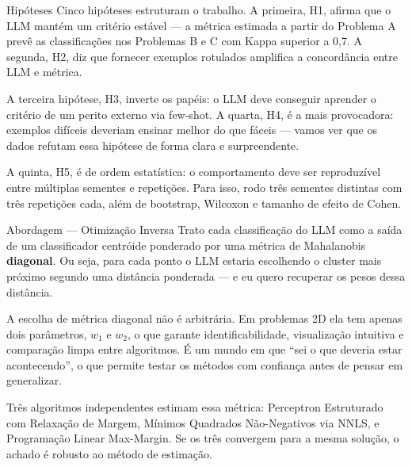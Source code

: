 \documentclass[aspectratio=169,10pt]{beamer}
\begin{document}
\begin{frame}{Hip\'oteses}
  \small
  Cinco hip\'oteses estruturam o trabalho. A primeira, H1, afirma que o LLM mant\'em um crit\'erio est\'avel
  --- a m\'etrica estimada a partir do Problema A prev\^e as classifica\c{c}\~oes nos Problemas B e C com
  Kappa superior a 0{,}7. A segunda, H2, diz que fornecer exemplos rotulados amplifica a concord\^ancia
  entre LLM e m\'etrica.
  \medskip

  A terceira hip\'otese, H3, inverte os pap\'eis: o LLM deve conseguir aprender o crit\'erio de um perito
  externo via few-shot. A quarta, H4, \'e a mais provocadora: exemplos dif\'iceis deveriam ensinar melhor
  do que f\'aceis --- vamos ver que os dados refutam essa hip\'otese de forma clara e surpreendente.
  \medskip

  A quinta, H5, \'e de ordem estat\'istica: o comportamento deve ser reproduz\'ivel entre m\'ultiplas sementes
  e repeti\c{c}\~oes. Para isso, rodo tr\^es sementes distintas com tr\^es repeti\c{c}\~oes cada, al\'em de
  bootstrap, Wilcoxon e tamanho de efeito de Cohen.
\end{frame}

\begin{frame}{Abordagem --- Otimiza\c{c}\~ao Inversa}
  \small
  Trato cada classifica\c{c}\~ao do LLM como a sa\'ida de um classificador centr\'oide ponderado por uma
  m\'etrica de Mahalanobis \textbf{diagonal}. Ou seja, para cada ponto o LLM estaria escolhendo o cluster
  mais pr\'oximo segundo uma dist\^ancia ponderada --- e eu quero recuperar os pesos dessa dist\^ancia.
  \medskip

  A escolha de m\'etrica diagonal n\~ao \'e arbitr\'aria. Em problemas 2D ela tem apenas dois par\^ametros,
  $w_1$ e $w_2$, o que garante identificabilidade, visualiza\c{c}\~ao intuitiva e compara\c{c}\~ao limpa
  entre algoritmos. \'E um mundo em que ``sei o que deveria estar acontecendo'', o que permite testar os
  m\'etodos com confian\c{c}a antes de pensar em generalizar.
  \medskip

  Tr\^es algoritmos independentes estimam essa m\'etrica: Perceptron Estruturado com Relaxa\c{c}\~ao de
  Margem, M\'inimos Quadrados N\~ao-Negativos via NNLS, e Programa\c{c}\~ao Linear Max-Margin. Se os tr\^es
  convergem para a mesma solu\c{c}\~ao, o achado \'e robusto ao m\'etodo de estima\c{c}\~ao.
\end{frame}
\end{document}
